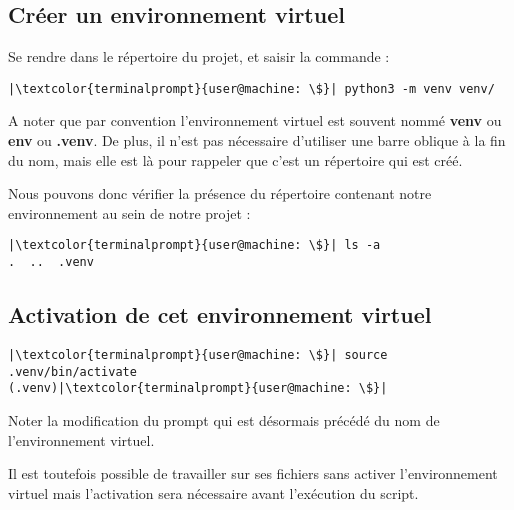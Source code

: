 \subsection*{Créer un environnement virtuel}
Se rendre dans le répertoire du projet, et saisir la commande :
\begin{lstlisting}[style=terminal]
|\textcolor{terminalprompt}{user@machine: \$}| python3 -m venv venv/
\end{lstlisting}

A noter que par convention l'environnement virtuel est souvent nommé \textbf{venv} ou \textbf{env} ou \textbf{.venv}. De plus, il n'est pas nécessaire d'utiliser une barre oblique à la fin du nom, mais elle est là pour rappeler que c'est un répertoire qui est créé.

Nous pouvons donc vérifier la présence du répertoire contenant notre environnement au sein de notre projet :
\begin{lstlisting}[style=terminal]
|\textcolor{terminalprompt}{user@machine: \$}| ls -a
.  ..  .venv
\end{lstlisting}

\subsection*{Activation de cet environnement virtuel}
\begin{lstlisting}[style=terminal]
|\textcolor{terminalprompt}{user@machine: \$}| source .venv/bin/activate
(.venv)|\textcolor{terminalprompt}{user@machine: \$}|
\end{lstlisting}

Noter la modification du prompt qui est désormais précédé du nom de l'environnement virtuel.

Il est toutefois possible de travailler sur ses fichiers sans activer l'environnement virtuel mais l'activation sera nécessaire avant l'exécution du script.

